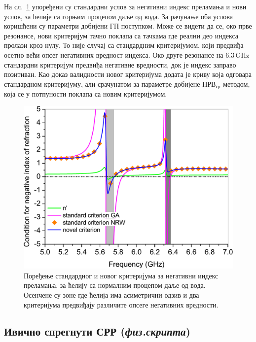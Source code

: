 На сл.~\ref{usl_norm} упоређени су стандардни услов за негативни индекс преламања и нови услов, за ћелије са горњим процепом даље од вода. За рачунање оба услова коришћени су параметри добијени ГП поступком. Може се видети да се, око прве резонансе, нови критеријум тачно поклапа са тачкама где реални део индекса пролази кроз нулу. То није случај са стандардним критеријумом, који предвиђа осетно већи опсег негативних вредност индекса. Око друге резонансе на 6.3\,GHz стандардни критеријум предвиђа негативне вредности, док је индекс заправо позитиван. Као доказ валидности новог критеријума додата је криву која одговара стандардном критеријуму, али срачунатом за параметре добијене $НРВ_{ср}$ методом, која се у потпуности поклапа са новим критеријумом.
\begin{figure}[!t]
\centering
\includegraphics[scale=\SkalaC]{slike/usl_norm.pdf}
\caption{Поређење стандардног и новог критеријума за негативни индекс преламања, за ћелију са нормалним процепом даље од вода. Осенчене су зоне где ћелија има асиметрични одзив и два критеријума предвиђају различите опсеге негативних вредности.}
\label{usl_norm}
\end{figure}

\subsection{Ивично спрегнути СРР (\emph{физ.скрипта})}

